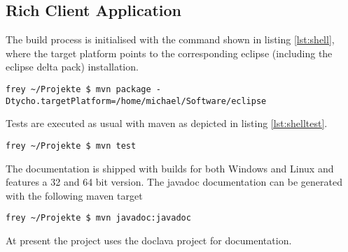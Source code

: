 \subsection{Rich Client Application}
The build process is initialised with the command shown in listing 
\ref{lst:shell}, where the target platform points to the corresponding eclipse 
(including the eclipse delta pack) installation.
\begin{lstlisting}[language=CMD, caption={\emph{Command for building the Flow RCP Application}},label={lst:shell}]
frey ~/Projekte $ mvn package -Dtycho.targetPlatform=/home/michael/Software/eclipse
\end{lstlisting}
Tests are executed as usual with maven as depicted in listing 
\ref{lst:shelltest}.
\begin{lstlisting}[language=CMD, caption={\emph{Command for testing the Flow RCP Application}},label={lst:shelltest}]
frey ~/Projekte $ mvn test
\end{lstlisting}
The documentation is shipped with builds for both Windows and Linux and features
a 32 and 64 bit version. The javadoc documentation can be generated with the 
following maven target
\begin{lstlisting}[language=CMD, caption={\emph{Command for generating Documentation for the Flow RCP Application}},label={lst:shelldoc}]
frey ~/Projekte $ mvn javadoc:javadoc
\end{lstlisting}
At present the project uses the doclava project for documentation.


